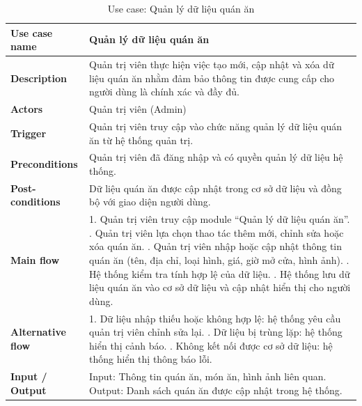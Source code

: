 \begingroup
\renewcommand{\arraystretch}{1.25}
\begin{longtable}{|p{4cm}|p{10cm}|}
\caption{Use case: Quản lý dữ liệu quán ăn} \\
\endfirsthead

\endhead

\endfoot

\endlastfoot

\hline

\textbf{Use case name} &
Quản lý dữ liệu quán ăn \\
\hline

\textbf{Description} &
Quản trị viên thực hiện việc tạo mới, cập nhật và xóa dữ liệu quán ăn nhằm đảm bảo thông tin được cung cấp cho người dùng là chính xác và đầy đủ. \\
\hline

\textbf{Actors} &
Quản trị viên (Admin) \\
\hline

\textbf{Trigger} &
Quản trị viên truy cập vào chức năng quản lý dữ liệu quán ăn từ hệ thống quản trị. \\
\hline

\textbf{Preconditions} &
Quản trị viên đã đăng nhập và có quyền quản lý dữ liệu hệ thống. \\
\hline

\textbf{Post-conditions} &
Dữ liệu quán ăn được cập nhật trong cơ sở dữ liệu và đồng bộ với giao diện người dùng. \\
\hline

\textbf{Main flow} &
1. Quản trị viên truy cập module ``Quản lý dữ liệu quán ăn''. \newline 2. Quản trị viên lựa chọn thao tác thêm mới, chỉnh sửa hoặc xóa quán ăn. \newline 3. Quản trị viên nhập hoặc cập nhật thông tin quán ăn (tên, địa chỉ, loại hình, giá, giờ mở cửa, hình ảnh). \newline 4. Hệ thống kiểm tra tính hợp lệ của dữ liệu. \newline 5. Hệ thống lưu dữ liệu quán ăn vào cơ sở dữ liệu và cập nhật hiển thị cho người dùng. \\
\hline

\textbf{Alternative flow} &
1. Dữ liệu nhập thiếu hoặc không hợp lệ: hệ thống yêu cầu quản trị viên chỉnh sửa lại. \newline 2. Dữ liệu bị trùng lặp: hệ thống hiển thị cảnh báo. \newline 3. Không kết nối được cơ sở dữ liệu: hệ thống hiển thị thông báo lỗi. \\
\hline

\textbf{Input / Output} &
Input: Thông tin quán ăn, món ăn, hình ảnh liên quan. \newline Output: Danh sách quán ăn được cập nhật trong hệ thống. \\
\hline

\end{longtable}
\endgroup


